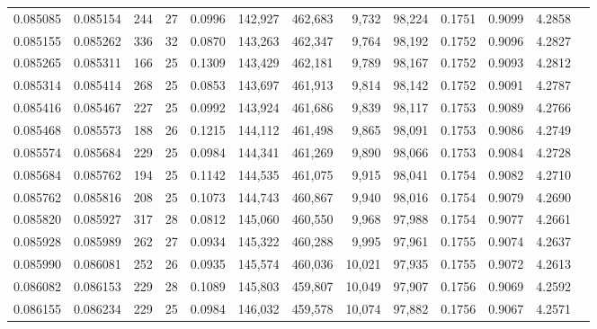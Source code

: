 \begin{tabular}{rrrrrrrrrrrrr}
0.085085 & 0.085154 & 244 &  27 &                                     0.0996 & 142,927 & 462,683 &   9,732 &  98,224 & 0.1751 & 0.9099 & 4.2858 \\
0.085155 & 0.085262 & 336 &  32 &                                     0.0870 & 143,263 & 462,347 &   9,764 &  98,192 & 0.1752 & 0.9096 & 4.2827 \\
0.085265 & 0.085311 & 166 &  25 &                                     0.1309 & 143,429 & 462,181 &   9,789 &  98,167 & 0.1752 & 0.9093 & 4.2812 \\
0.085314 & 0.085414 & 268 &  25 &                                     0.0853 & 143,697 & 461,913 &   9,814 &  98,142 & 0.1752 & 0.9091 & 4.2787 \\
0.085416 & 0.085467 & 227 &  25 &                                     0.0992 & 143,924 & 461,686 &   9,839 &  98,117 & 0.1753 & 0.9089 & 4.2766 \\
0.085468 & 0.085573 & 188 &  26 &                                     0.1215 & 144,112 & 461,498 &   9,865 &  98,091 & 0.1753 & 0.9086 & 4.2749 \\
0.085574 & 0.085684 & 229 &  25 &                                     0.0984 & 144,341 & 461,269 &   9,890 &  98,066 & 0.1753 & 0.9084 & 4.2728 \\
0.085684 & 0.085762 & 194 &  25 &                                     0.1142 & 144,535 & 461,075 &   9,915 &  98,041 & 0.1754 & 0.9082 & 4.2710 \\
0.085762 & 0.085816 & 208 &  25 &                                     0.1073 & 144,743 & 460,867 &   9,940 &  98,016 & 0.1754 & 0.9079 & 4.2690 \\
0.085820 & 0.085927 & 317 &  28 &                                     0.0812 & 145,060 & 460,550 &   9,968 &  97,988 & 0.1754 & 0.9077 & 4.2661 \\
0.085928 & 0.085989 & 262 &  27 &                                     0.0934 & 145,322 & 460,288 &   9,995 &  97,961 & 0.1755 & 0.9074 & 4.2637 \\
0.085990 & 0.086081 & 252 &  26 &                                     0.0935 & 145,574 & 460,036 &  10,021 &  97,935 & 0.1755 & 0.9072 & 4.2613 \\
0.086082 & 0.086153 & 229 &  28 &                                     0.1089 & 145,803 & 459,807 &  10,049 &  97,907 & 0.1756 & 0.9069 & 4.2592 \\
0.086155 & 0.086234 & 229 &  25 &                                     0.0984 & 146,032 & 459,578 &  10,074 &  97,882 & 0.1756 & 0.9067 & 4.2571 \\

\end{tabular}
